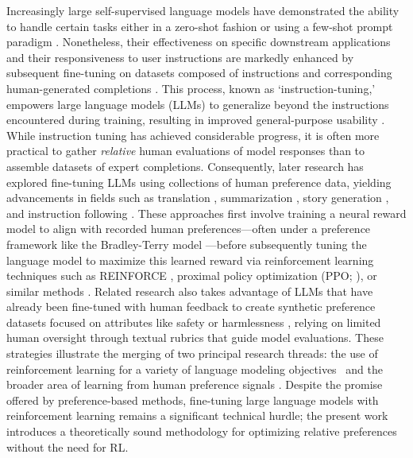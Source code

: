Increasingly large self-supervised language models have demonstrated the ability to handle certain tasks either in a zero-shot fashion \citep{radford2019language} or using a few-shot prompt paradigm \citep{gpt3,megatron,chowdhery2022palm}. Nonetheless, their effectiveness on specific downstream applications and their responsiveness to user instructions are markedly enhanced by subsequent fine-tuning on datasets composed of instructions and corresponding human-generated completions \citep{mishra-etal-2022-cross,sanh2022multitask,chung2022scaling,thoppilan2022lamda}. This process, known as `instruction-tuning,' empowers large language models (LLMs) to generalize beyond the instructions encountered during training, resulting in improved general-purpose usability \citep{chung2022scaling}. While instruction tuning has achieved considerable progress, it is often more practical to gather \textit{relative} human evaluations of model responses than to assemble datasets of expert completions. Consequently, later research has explored fine-tuning LLMs using collections of human preference data, yielding advancements in fields such as translation \citep{kreutzer-etal-2018-reliability}, summarization \citep{stiennon2022learning,ziegler2020finetuning}, story generation \citep{ziegler2020finetuning}, and instruction following \citep{ouyang2022training,ramamurthy2023is}. These approaches first involve training a neural reward model to align with recorded human preferences—often under a preference framework like the Bradley-Terry model \citep{bradley1952rankanalysis}—before subsequently tuning the language model to maximize this learned reward via reinforcement learning techniques such as REINFORCE \citep{williams1992reinforce}, proximal policy optimization (PPO; \cite{schulman2017proximal}), or similar methods \citep{ramamurthy2023is}. Related research also takes advantage of LLMs that have already been fine-tuned with human feedback to create synthetic preference datasets focused on attributes like safety or harmlessness \citep{bai2022constitutional}, relying on limited human oversight through textual rubrics that guide model evaluations. These strategies illustrate the merging of two principal research threads: the use of reinforcement learning for a variety of language modeling objectives~\citep{Ranzato2015SequenceLT,paulus2018a,wu2018learning} and the broader area of learning from human preference signals \citep{christiano2017deep,kupcsik2018learning}. Despite the promise offered by preference-based methods, fine-tuning large language models with reinforcement learning remains a significant technical hurdle; the present work introduces a theoretically sound methodology for optimizing relative preferences without the need for RL.


